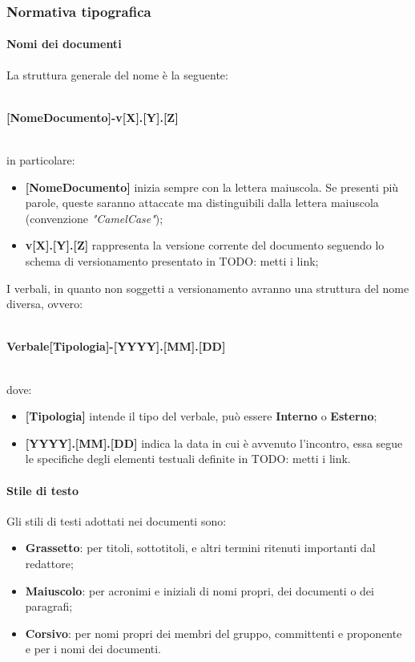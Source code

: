 \subsubsection{Normativa tipografica}
\paragraph{Nomi dei documenti}
La struttura generale del nome è la seguente: \\ \\
\centerline{\textbf{[NomeDocumento]-v[X].[Y].[Z]}}\\
in particolare:
\begin{itemize}
\item \textbf{[NomeDocumento]} inizia sempre con la lettera maiuscola. Se presenti più parole, queste saranno attaccate ma distinguibili dalla lettera maiuscola (convenzione \textit{"CamelCase"});
\item \textbf{v[X].[Y].[Z]} rappresenta la versione corrente del documento seguendo lo schema di versionamento presentato in TODO: metti i link;
\end{itemize}
I verbali, in quanto non soggetti a versionamento avranno una struttura del nome diversa, ovvero:\\ \\
\centerline{\textbf{Verbale[Tipologia]-[YYYY].[MM].[DD]}} \\
dove:
\begin{itemize}
\item \textbf{[Tipologia]} intende il tipo del verbale, può essere \textbf{Interno} o \textbf{Esterno};
\item \textbf{[YYYY].[MM].[DD]} indica la data in cui è avvenuto l'incontro, essa segue le specifiche degli elementi testuali definite in TODO: metti i link.
\end{itemize}


\paragraph{Stile di testo}
Gli stili di testi adottati nei documenti sono:
\begin{itemize}
\item \textbf{Grassetto}: per titoli, sottotitoli, e altri termini ritenuti importanti dal redattore;
\item \textbf{Maiuscolo}: per acronimi e iniziali di nomi propri, dei documenti o dei paragrafi;
\item \textbf{Corsivo}: per nomi propri dei membri del gruppo, committenti e proponente e per i nomi dei documenti.
\end{itemize}


